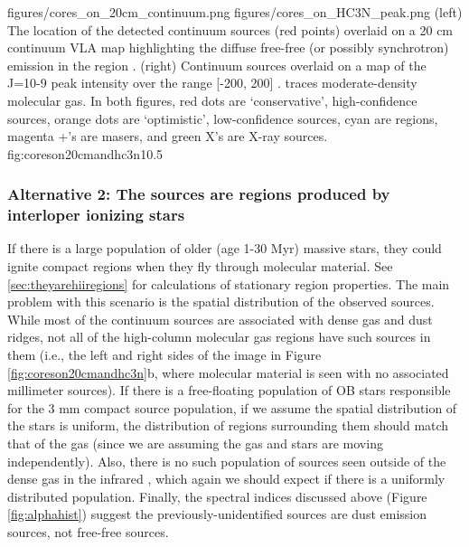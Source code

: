 \documentclass[twocolumn]{aastex61}
\begin{document}
\FigureTwo
{figures/cores_on_20cm_continuum.png}
{figures/cores_on_HC3N_peak.png}
{(left) The location of the detected continuum sources (red points) overlaid on a 20
cm continuum VLA map highlighting the diffuse free-free (or possibly
synchrotron) emission in the region \citep{Yusef-Zadeh2004a}.
(right) Continuum sources overlaid on a map
of the \cyanoacetylene J=10-9 peak intensity over the range [-200, 200] \kms.
\cyanoacetylene traces moderate-density molecular gas.  In both figures, red
dots are `conservative',
high-confidence sources, orange dots are `optimistic', low-confidence sources,
cyan are \hii regions, magenta +'s are masers, and green X's are X-ray sources.
}
{fig:coreson20cmandhc3n}{1}{0.5\textwidth}

\subsubsection{Alternative 2: The sources are \hii regions produced by
interloper ionizing stars}
If there is a large population of older (age 1-30 Myr) massive stars, they could
ignite compact \hii regions when they fly through molecular material.  See
\ref{sec:theyarehiiregions} for calculations of stationary \hii region
properties.  The main problem with this scenario is the spatial distribution of
the observed sources.  While most of the continuum sources are associated with
dense gas and dust ridges, not all of the high-column molecular gas regions
have such sources in them (i.e., the left and right sides of the image in
Figure \ref{fig:coreson20cmandhc3n}b, where molecular material is seen with no
associated millimeter sources).  If there is a free-floating population of OB
stars responsible for the 3 mm compact source population, if we assume the
spatial distribution of the stars is uniform, the distribution of \hii regions
surrounding them should match that of the gas (since we are assuming the gas and
stars are moving independently).  Also, there is no such population of sources
seen outside of the dense gas in the infrared \citep[TODO: Who has done
infrared studies of Sgr B2?  You can infer what I have stated `by inspection'
of 2MASS, but it would be more straightforward to quote someone else][]{},
which again we should expect if there is a uniformly distributed population.
Finally, the spectral indices discussed above (Figure \ref{fig:alphahist})
suggest the previously-unidentified sources are dust emission sources, not
free-free sources.
\end{document}
